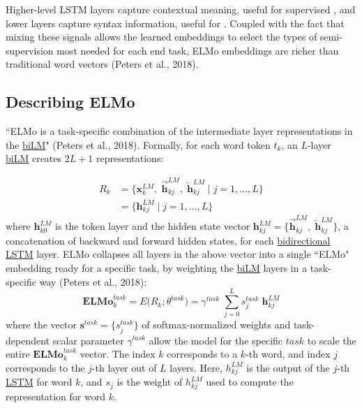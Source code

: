Higher-level LSTM layers capture contextual meaning, useful for supervised , and lower layers capture syntax information, useful for . Coupled with the fact that mixing these signals allows the learned embeddings to select the types of semi-supervision most needed for each end task, ELMo embeddings are richer than traditional word vectors (Peters et al., 2018). 


\subsection{Describing ELMo} 

``ELMo is a task-specific combination of the intermediate layer representations in the \hyperref[sec:BidirectionalLM]{biLM}" (Peters et al., 2018). Formally, for each word token $t_k$, an $L$-layer \hyperref[sec:BidirectionalLM]{biLM} creates $2L + 1$ representations: 

$$
\begin{array}{ll}
R_k 
&= \Big \{ \mathbf{x}_k^{LM}, \; \overrightarrow{\mathbf{h}}_{kj}^{LM}, \; \overleftarrow{\mathbf{h}}_{kj}^{LM} \; | \; j = 1,...,L \Big \} \\
&= \Big \{ \mathbf{h}_{kj}^{LM} \; | \; j = 1,...,L \Big \}
\end{array}
$$
where $\mathbf{h}_{k0}^{LM}$ is the token layer and the hidden state vector $\mathbf{h}_{kj}^{LM} = \Big \{ \overrightarrow{\mathbf{h}}_{kj}^{LM}, \; \overleftarrow{\mathbf{h}}_{kj}^{LM}  \}$, a concatenation of backward and forward hidden states, for each \hyperref[sec:BidirectionalLM]{bidirectional} \hyperref[sec:LSTM]{LSTM} layer. ELMo collapses all layers in the above vector into a single ``ELMo" embedding ready for a specific task, by weighting the \hyperref[sec:BidirectionalLM]{biLM} layers in a task-specific way (Peters et al., 2018): 
$$
\textbf{ELMo}_k^{task} = E \Big( R_k; \theta^{task} \Big) = \gamma^{task} \; \sum_{j=0}^L s_j^{task} \; \mathbf{h}_{kj}^{LM}
$$
where the vector $\mathbf{s}^{task} = \Big\{ s_j^{task} \Big\}$ of softmax-normalized weights and task-dependent scalar parameter $\gamma^{task}$ allow the model for the specific $task$ to scale the entire $\textbf{ELMo}_k^{task}$ vector. The index $k$ corresponds to a $k$-th word, and index $j$ corresponds to the $j$-th layer out of $L$ layers. Here, $h_{kj}^{LM}$ is the output of the $j$-th \hyperref[sec:LSTM]{LSTM} for word $k$, and $s_j$ is the weight of $h_{kj}^{LM}$ used to compute the representation for word $k$. \newline 

